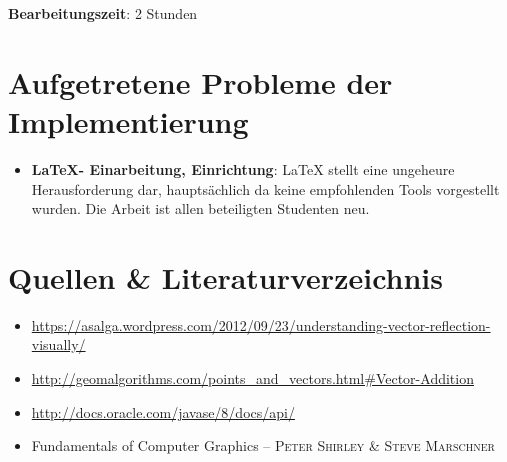 \documentclass[tog]{acmsiggraph}
\begin{document}
\textbf{Bearbeitungszeit}: 2 Stunden

\section{Aufgetretene Probleme der Implementierung}

\begin{itemize}
	\item \textbf{\LaTeX - Einarbeitung, Einrichtung}:\newline
			LaTeX stellt eine ungeheure Herausforderung dar, hauptsächlich da keine empfohlenden Tools vorgestellt wurden. Die Arbeit ist allen beteiligten Studenten neu.
\end{itemize}

\section{Quellen \& Literaturverzeichnis}

\begin{itemize}
	\item \url{https://asalga.wordpress.com/2012/09/23/understanding-vector-reflection-visually/}
	\item \url{http://geomalgorithms.com/points_and_vectors.html#Vector-Addition}
	\item \url{http://docs.oracle.com/javase/8/docs/api/}
	\item Fundamentals of Computer Graphics -- \textsc{Peter Shirley \& Steve Marschner}
\end{itemize}
\end{document}

